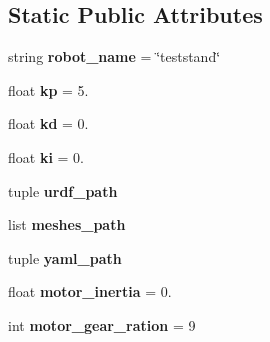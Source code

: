 \subsection*{Static Public Attributes}
\begin{DoxyCompactItemize}
\item 
string {\bfseries robot\+\_\+name} = \char`\"{}teststand\char`\"{}\hypertarget{classpy__robot__properties__teststand_1_1config_1_1TeststandConfig_ab68e64f324ea47a4c81f9cc82aeb6cf4}{}\label{classpy__robot__properties__teststand_1_1config_1_1TeststandConfig_ab68e64f324ea47a4c81f9cc82aeb6cf4}

\item 
float {\bfseries kp} = 5.\hypertarget{classpy__robot__properties__teststand_1_1config_1_1TeststandConfig_a360b8c5b84b6849da15236a2c98ff991}{}\label{classpy__robot__properties__teststand_1_1config_1_1TeststandConfig_a360b8c5b84b6849da15236a2c98ff991}

\item 
float {\bfseries kd} = 0.\hypertarget{classpy__robot__properties__teststand_1_1config_1_1TeststandConfig_ac8ef3cbf2ca5a3b84dac6713cfab2a90}{}\label{classpy__robot__properties__teststand_1_1config_1_1TeststandConfig_ac8ef3cbf2ca5a3b84dac6713cfab2a90}

\item 
float {\bfseries ki} = 0.\hypertarget{classpy__robot__properties__teststand_1_1config_1_1TeststandConfig_a1beb333b141d33d055368ff5418b3c09}{}\label{classpy__robot__properties__teststand_1_1config_1_1TeststandConfig_a1beb333b141d33d055368ff5418b3c09}

\item 
tuple {\bfseries urdf\+\_\+path}
\item 
list {\bfseries meshes\+\_\+path}
\item 
tuple {\bfseries yaml\+\_\+path}
\item 
float {\bfseries motor\+\_\+inertia} = 0.\hypertarget{classpy__robot__properties__teststand_1_1config_1_1TeststandConfig_a0d2f901b065d005500004294a0999ed7}{}\label{classpy__robot__properties__teststand_1_1config_1_1TeststandConfig_a0d2f901b065d005500004294a0999ed7}

\item 
int {\bfseries motor\+\_\+gear\+\_\+ration} = 9\hypertarget{classpy__robot__properties__teststand_1_1config_1_1TeststandConfig_a934b88c4ed3899692dafb89134bfe3da}{}\label{classpy__robot__properties__teststand_1_1config_1_1TeststandConfig_a934b88c4ed3899692dafb89134bfe3da}


\end{DoxyCompactItemize}

